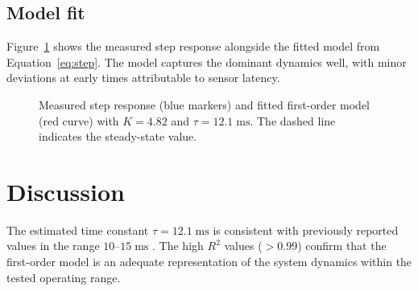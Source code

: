 \documentclass[12pt,a4paper]{article}
\begin{document}
\subsection{Model fit}

Figure~\ref{fig:results} shows the measured step response alongside
the fitted model from Equation~\eqref{eq:step}. The model captures
the dominant dynamics well, with minor deviations at early times
attributable to sensor latency.

\begin{figure}[H]
  \centering
  \caption{Measured step response (blue markers) and fitted first-order
    model (red curve) with $K = 4.82$ and $\tau = 12.1\;\text{ms}$.
    The dashed line indicates the steady-state value.}
  \label{fig:results}
\end{figure}


\section{Discussion}
\label{sec:discussion}

The estimated time constant $\tau = 12.1\;\text{ms}$ is consistent
with previously reported values in the range $10$--$15\;\text{ms}$
\cite{smith2023}. The high $R^2$ values ($>0.99$) confirm that the
first-order model is an adequate representation of the system dynamics
within the tested operating range.
\end{document}
